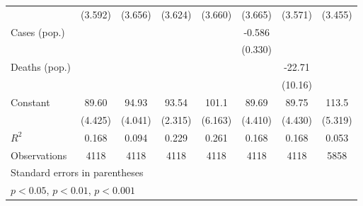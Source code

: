 \documentclass{article}
\begin{document}
{\begin{longtable}{l*{7}{c}}
                &  (3.592)         &  (3.656)         &  (3.624)         &  (3.660)         &  (3.665)         &  (3.571)         &  (3.455)         \\
Cases (pop.)    &                  &                  &                  &                  &   -0.586         &                  &                  \\
                &                  &                  &                  &                  &  (0.330)         &                  &                  \\
Deaths (pop.)   &                  &                  &                  &                  &                  &   -22.71\sym{*}  &                  \\
                &                  &                  &                  &                  &                  &  (10.16)         &                  \\
Constant        &    89.60\sym{***}&    94.93\sym{***}&    93.54\sym{***}&    101.1\sym{***}&    89.69\sym{***}&    89.75\sym{***}&    113.5\sym{***}\\
                &  (4.425)         &  (4.041)         &  (2.315)         &  (6.163)         &  (4.410)         &  (4.430)         &  (5.319)         \\
\hline
\(R^{2}\)       &    0.168         &    0.094         &    0.229         &    0.261         &    0.168         &    0.168         &    0.053         \\
Observations    &     4118         &     4118         &     4118         &     4118         &     4118         &     4118         &     5858         \\
\hline\hline
\multicolumn{8}{l}{\footnotesize Standard errors in parentheses}\\
\multicolumn{8}{l}{\footnotesize \sym{*} \(p<0.05\), \sym{**} \(p<0.01\), \sym{***} \(p<0.001\)}\\
\end{longtable}
}
\end{document}
